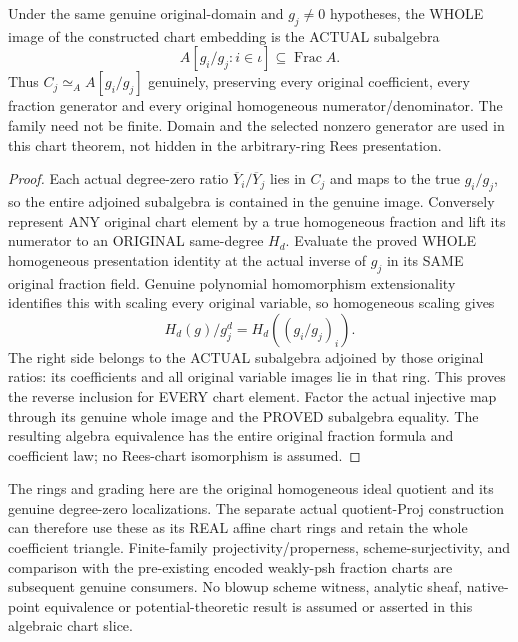 \begin{theorem}
\label{algebra:actual-rees-degree-zero-chart-equivalence}
\leanok
Under the same genuine original-domain and $g_j\ne0$ hypotheses, the WHOLE
image of the constructed chart embedding is the ACTUAL subalgebra
\[
 A[g_i/g_j:i\in\iota]\subseteq\operatorname{Frac}A.
\]
Thus $C_j\simeq_A A[g_i/g_j]$ genuinely, preserving every original coefficient,
every fraction generator and every original homogeneous numerator/denominator.
The family need not be finite. Domain and the selected nonzero generator are
used in this chart theorem, not hidden in the arbitrary-ring Rees presentation.
\end{theorem}
\begin{proof}
Each actual degree-zero ratio $\overline Y_i/\overline Y_j$ lies in $C_j$ and
maps to the true $g_i/g_j$, so the entire adjoined subalgebra is contained in
the genuine image. Conversely represent ANY original chart element by a true
homogeneous fraction and lift its numerator to an ORIGINAL same-degree $H_d$.
Evaluate the proved WHOLE homogeneous presentation identity at the actual
inverse of $g_j$ in its SAME original fraction field. Genuine polynomial
homomorphism extensionality identifies this with scaling every original variable,
so homogeneous scaling gives
\[
 H_d(g)/g_j^d=H_d((g_i/g_j)_i).
\]
The right side belongs to the ACTUAL subalgebra adjoined by those original
ratios: its coefficients and all original variable images lie in that ring.
This proves the reverse inclusion for EVERY chart element. Factor the actual
injective map through its genuine whole image and the PROVED subalgebra
equality. The resulting algebra equivalence has the entire original fraction
formula and coefficient law; no Rees-chart isomorphism is assumed.
\end{proof}

\begin{remark}
The rings and grading here are the original homogeneous ideal quotient and
its genuine degree-zero localizations. The separate actual quotient-Proj
construction can therefore use these as its REAL affine chart rings and
retain the whole coefficient triangle. Finite-family projectivity/properness,
scheme-surjectivity, and comparison with the pre-existing encoded weakly-psh
fraction charts are subsequent genuine consumers. No blowup scheme witness,
analytic sheaf, native-point equivalence or potential-theoretic result is
assumed or asserted in this algebraic chart slice.
\end{remark}
